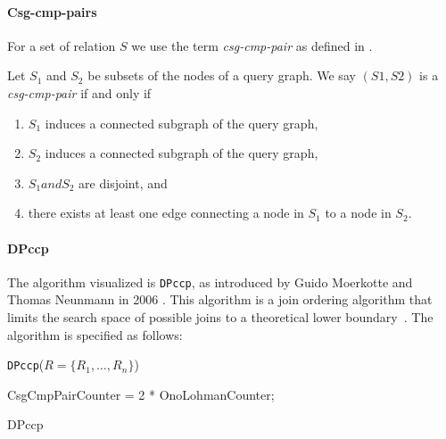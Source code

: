\paragraph{Csg-cmp-pairs}
For a set of relation $S$ we use the term \textit{csg-cmp-pair} as defined in \cite{moerkotte2006analysis}.
\begin{definition}
    Let $S_1$ and $S_2$ be subsets of the nodes of a query graph. We say $(S1, S2)$ is a \textit{csg-cmp-pair} if and only if
    \begin{enumerate}
        \item $S_1$ induces a connected subgraph of the query graph,
        \item $S_2$ induces a connected subgraph of the query graph,
        \item $S_1 and S_2$ are disjoint, and
        \item there exists at least one edge connecting a node in $S_1$ to a node in $S_2$.
    \end{enumerate}
\end{definition}

\paragraph{DPccp}
The algorithm visualized is \texttt{DPccp}, as introduced by Guido Moerkotte and Thomas Neunmann in 2006 \cite{moerkotte2006analysis}. This algorithm is a join ordering algorithm that limits the search space of possible joins to a theoretical lower boundary \cite{moerkotte2009building}. 
The algorithm is specified as follows:

\vspace{0.5cm}
\texttt{DPccp}($R = \{R_1, \ldots, R_n\}$)
\begin{algorithm}[H]
\BlankLine
{}
CsgCmpPairCounter = 2 * OnoLohmanCounter;\\
\vspace{0.5cm}
\caption{DPccp}
\end{algorithm}

